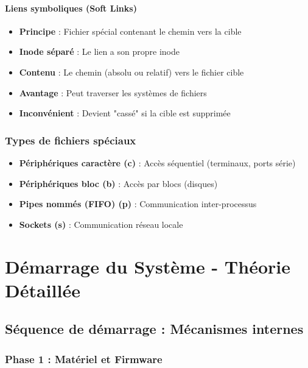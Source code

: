 \documentclass[12pt,a4paper]{article}
\begin{document}
\paragraph{Liens symboliques (Soft Links)}
\begin{itemize}
    \item \textbf{Principe} : Fichier spécial contenant le chemin vers la cible
    \item \textbf{Inode séparé} : Le lien a son propre inode
    \item \textbf{Contenu} : Le chemin (absolu ou relatif) vers le fichier cible
    \item \textbf{Avantage} : Peut traverser les systèmes de fichiers
    \item \textbf{Inconvénient} : Devient "cassé" si la cible est supprimée
\end{itemize}

\subsubsection{Types de fichiers spéciaux}

\begin{itemize}
    \item \textbf{Périphériques caractère (c)} : Accès séquentiel (terminaux, ports série)
    \item \textbf{Périphériques bloc (b)} : Accès par blocs (disques)
    \item \textbf{Pipes nommés (FIFO) (p)} : Communication inter-processus
    \item \textbf{Sockets (s)} : Communication réseau locale
\end{itemize}


\section{Démarrage du Système - Théorie Détaillée}

\subsection{Séquence de démarrage : Mécanismes internes}

\subsubsection{Phase 1 : Matériel et Firmware}
\end{document}
